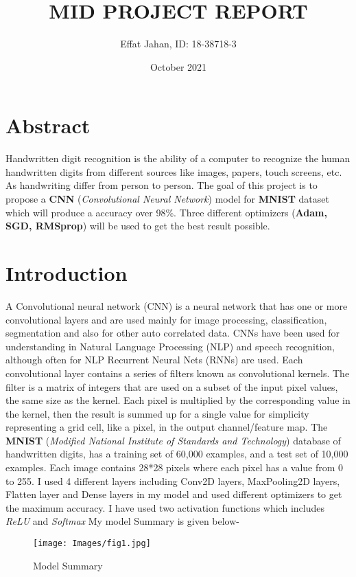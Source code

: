 \documentclass[11pt,a4paper]{article}
\title{MID PROJECT REPORT}
\author{Effat Jahan, ID: 18-38718-3}
\date{October 2021}
\begin{document}
\maketitle

\section{Abstract}
Handwritten digit recognition is the ability of a computer to recognize the human handwritten digits from different sources like images, papers, touch screens, etc. As handwriting differ from person to person. The goal of this project is to propose a \textbf{CNN} (\textit{Convolutional Neural Network}) model for \textbf{MNIST} dataset which will produce a accuracy over 98\%. Three different optimizers (\textbf{Adam, SGD, RMSprop}) will be used to get the best result possible.

\section{Introduction}

A Convolutional neural network (CNN) is a neural network that has one or more convolutional layers and are used mainly for image processing, classification, segmentation and also for other auto correlated data. CNNs have been used for understanding in Natural Language Processing (NLP) and speech recognition, although often for NLP Recurrent Neural Nets (RNNs) are used. Each convolutional layer contains a series of filters known as convolutional kernels. The filter is a matrix of integers that are used on a subset of the input pixel values, the same size as the kernel. Each pixel is multiplied by the corresponding value in the kernel, then the result is summed up for a single value for simplicity representing a grid cell, like a pixel, in the output channel/feature map.
\vspace{.5cm}
The \textbf{MNIST} (\textit{Modified National Institute of Standards and Technology}) database of handwritten digits, has a training set of 60,000 examples, and a test set of 10,000 examples. Each image contains 28*28 pixels where each pixel has a value from 0 to 255. I used 4 different layers including Conv2D layers, MaxPooling2D layers, Flatten layer and Dense layers in my model and used different optimizers to get the maximum accuracy. I have used two activation functions which includes \textit{ReLU} and \textit{Softmax} My model Summary is given below-
\begin{figure}[h]
\centering
    \texttt{[image: Images/fig1.jpg]}
    \caption{Model Summary}
    \label{fig:my_label}
\end{figure}
\end{document}
